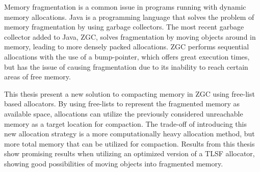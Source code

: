 
Memory fragmentation is a common issue in programs running with dynamic memory allocations. Java is a programming language that solves the problem of memory fragmentation by using garbage collectors. The most recent garbage collector added to Java, ZGC, solves fragmentation by moving objects around in memory, leading to more densely packed allocations. ZGC performs sequential allocations with the use of a bump-pointer, which offers great execution times, but has the issue of causing fragmentation due to its inability to reach certain areas of free memory.

This thesis present a new solution to compacting memory in ZGC using free-list based allocators. By using free-lists to represent the fragmented memory as available space, allocations can utilize the previously considered unreachable memory as a target location for compaction. The trade-off of introducing this new allocation strategy is a more computationally heavy allocation method, but more total memory that can be utilized for compaction. Results from this thesis show promising results when utilizing an optimized version of a TLSF allocator, showing good possibilities of moving objects into fragmented memory.



